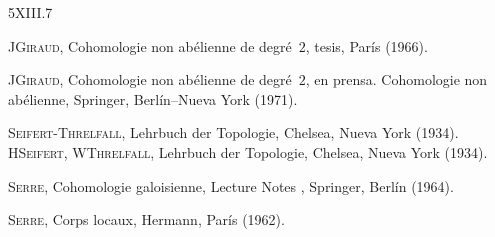 

\begin{sgabibliography}{5}{XIII.7}

 J\ptbl \textsc{Giraud}, Cohomologie non abélienne de
degré~$2$, tesis, París (1966).

 J\ptbl \textsc{Giraud},
{Cohomologie non abélienne de degré~$2$, en prensa.}
{Cohomologie non abélienne, Springer, Berlín--Nueva York (1971).}

{\textsc{Seifert}-\textsc{Threlfall}, Lehrbuch der Topologie, Chelsea,
Nueva York (1934).}
{H\ptbl\textsc{Seifert}, W\ptbl\textsc{Threlfall}, Lehrbuch der Topologie,
Chelsea, Nueva York (1934).}

%
\textsc{Serre}, Cohomologie galoisienne, Lecture Notes
, Springer, Berlín (1964).

%
\textsc{Serre}, Corps locaux, Hermann, París (1962).
\end{sgabibliography}

\backmatter
\def\indexname{Índice terminológico}
\printindex

\def\indexname{Índice de notaciones}

